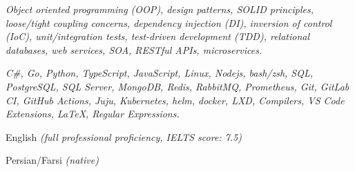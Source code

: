 \documentclass[9pt,a4paper]{extarticle}
\begin{document}
\begin{customitemize}
    \item {}
    \begin{customitemize}
        \item[] {\textit{Object oriented programming (OOP), design patterns, SOLID principles,
                        loose/tight coupling concerns, dependency injection (DI), inversion of
                        control (IoC), unit/integration tests, test-driven development (TDD),
                        relational databases, web services, SOA, RESTful APIs, microservices.
                    }}
    \end{customitemize}
    \item {}
    \begin{customitemize}
        \item[] {
                    \textit{C\#,
                        Go,
                        Python,
                        TypeScript,
                        JavaScript,
                        Linux,
                        Nodejs,
                        bash/zsh,
                        SQL,
                        PostgreSQL,
                        SQL Server,
                        MongoDB,
                        Redis,
                        RabbitMQ,
                        Prometheus,
                        Git,
                        GitLab CI,
                        GitHub Actions,
                        Juju,
                        Kubernetes,
                        helm,
                        docker,
                        LXD,
                        Compilers,
                        VS Code Extensions,
                        \LaTeX,
                        Regular Expressions.}
              }
    \end{customitemize}
    \item {}
    \begin{customitemize}
        \item {English \textit{(full professional proficiency, IELTS score: 7.5)}}
        \item {Persian/Farsi \textit{(native)}}
    \end{customitemize}
\end{customitemize}
\sectionrule{}
\end{document}
